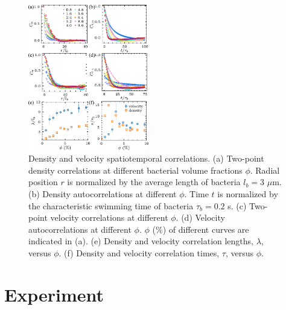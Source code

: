\documentclass[twocolumn,aps,prx,amsmath,amssymb,longbibliography]{revtex4-2}
\begin{document}
\begin{figure}[t]
\begin{center}
\includegraphics[width=0.47\textwidth]{figures/spatiotemporal-correlations/v6.pdf}
\caption[spatiotemporal-correlations.]
{
Density and velocity spatiotemporal correlations. (a) Two-point density correlations at different bacterial volume fractions $\phi$. Radial position $r$ is normalized by the average length of bacteria $l_b = 3$ $\mu$m. (b) Density autocorrelations at different $\phi$. Time $t$ is normalized by the characteristic swimming time of bacteria $\tau_b = 0.2$ s. (c) Two-point velocity correlations at different $\phi$. (d) Velocity autocorrelations at different $\phi$. $\phi$ ($\%$) of different curves are indicated in (a). (e) Density and velocity correlation lengths, $\lambda$, versus $\phi$. (f) Density and velocity correlation times, $\tau$, versus $\phi$.
}
\label{fig:spatiotemporal-correlations}
\end{center}
\end{figure}

\section{Experiment}
\end{document}
